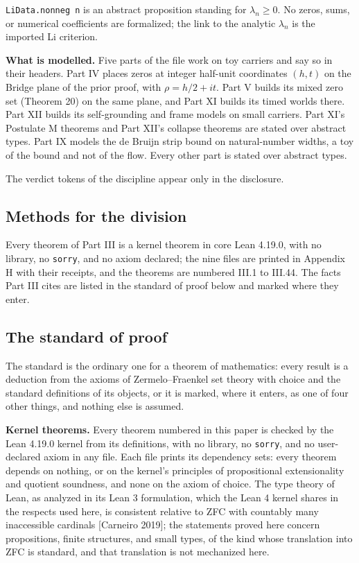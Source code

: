 \documentclass[10pt,twocolumn]{article}
\begin{document}
\texttt{LiData.nonneg\ n} is an abstract proposition standing for
\(\lambda_n \geq 0\). No zeros, sums, or numerical coefficients are
formalized; the link to the analytic \(\lambda_n\) is the imported Li
criterion.

\textbf{What is modelled.} Five parts of the file work on toy carriers
and say so in their headers. Part IV places zeros at integer half-unit
coordinates \((h, t)\) on the Bridge plane of the prior proof, with
\(\rho = h/2 + it\). Part V builds its mixed zero set (Theorem 20) on
the same plane, and Part XI builds its timed worlds there. Part XII
builds its self-grounding and frame models on small carriers. Part XI's
Postulate M theorems and Part XII's collapse theorems are stated over
abstract types. Part IX models the de Bruijn strip bound on
natural-number widths, a toy of the bound and not of the flow. Every
other part is stated over abstract types.

The verdict tokens of the discipline appear only in the disclosure.

\hypertarget{methods-for-the-division}{%
\subsection{Methods for the division}\label{methods-for-the-division}}

Every theorem of Part III is a kernel theorem in core Lean 4.19.0, with
no library, no \texttt{sorry}, and no axiom declared; the nine files are
printed in Appendix H with their receipts, and the theorems are numbered
III.1 to III.44. The facts Part III cites are listed in the standard of
proof below and marked where they enter.

\hypertarget{the-standard-of-proof}{%
\subsection{The standard of proof}\label{the-standard-of-proof}}

The standard is the ordinary one for a theorem of mathematics: every
result is a deduction from the axioms of Zermelo--Fraenkel set theory
with choice and the standard definitions of its objects, or it is
marked, where it enters, as one of four other things, and nothing else
is assumed.

\textbf{Kernel theorems.} Every theorem numbered in this paper is
checked by the Lean 4.19.0 kernel from its definitions, with no library,
no \texttt{sorry}, and no user-declared axiom in any file. Each file
prints its dependency sets: every theorem depends on nothing, or on the
kernel's principles of propositional extensionality and quotient
soundness, and none on the axiom of choice. The type theory of Lean, as
analyzed in its Lean 3 formulation, which the Lean 4 kernel shares in
the respects used here, is consistent relative to ZFC with countably
many inaccessible cardinals {[}Carneiro 2019{]}; the statements proved
here concern propositions, finite structures, and small types, of the
kind whose translation into ZFC is standard, and that translation is not
mechanized here.
\end{document}
